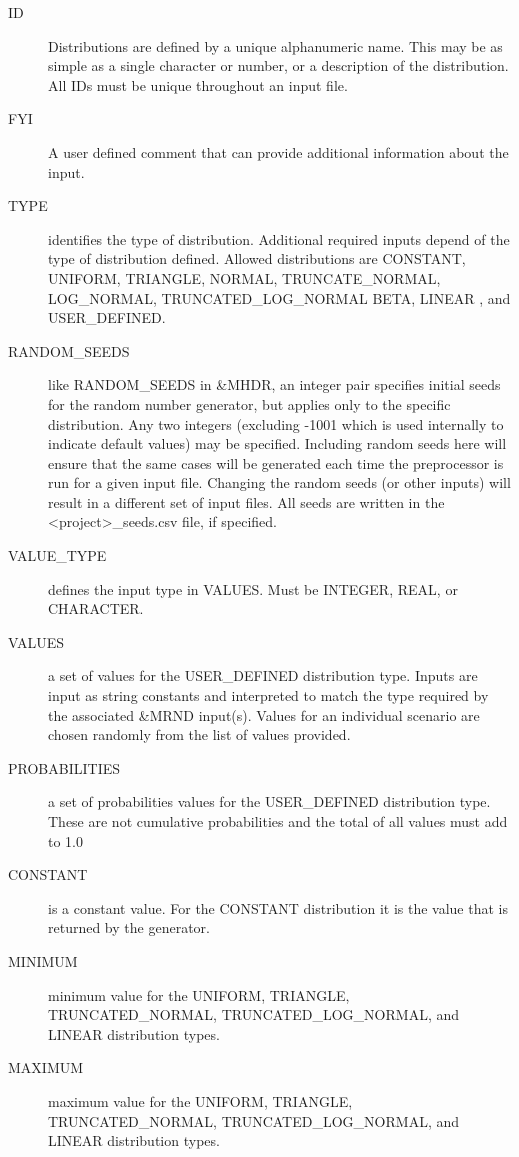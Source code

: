 \documentclass[12pt,twoside]{book}
\begin{document}
\begin{description}
  \item[ID] Distributions are defined by a unique alphanumeric name. This may be as simple as a single character or number, or a description of the distribution. All IDs must be unique throughout an input file.
  \item[FYI] A user defined comment that can provide additional information about the input.
  \item[TYPE] identifies the type of distribution. Additional required inputs depend of the type of distribution defined. Allowed distributions are {\ct CONSTANT},  {\ct UNIFORM}, {\ct TRIANGLE}, {\ct NORMAL}, {\ct TRUNCATE\_NORMAL}, {\ct LOG\_NORMAL}, {\ct TRUNCATED\_LOG\_NORMAL} {\ct BETA}, {\ct LINEAR }, and {\ct USER\_DEFINED}.
  \item[RANDOM\_SEEDS] like {\ct RANDOM\_SEEDS} in {\ct \&MHDR}, an integer pair specifies initial seeds for the random number generator, but applies only to the specific distribution. Any two integers (excluding -1001 which is used internally to indicate default values) may be specified. Including random seeds here will ensure that the same cases will be generated each time the preprocessor is run for a given input file. Changing the random seeds (or other inputs) will result in a different set of input files. All seeds are written in the {\ct <project>\_seeds.csv} file, if specified.
  \item[VALUE\_TYPE] defines the input type in VALUES. Must be {\ct INTEGER}, {\ct REAL}, or {\ct CHARACTER}.
  \item[VALUES] a set of values for the {\ct USER\_DEFINED} distribution type. Inputs are input as string constants and interpreted to match the type required by the associated {\ct \&MRND} input(s). Values for an individual scenario are chosen randomly from the list of values provided.
  \item[PROBABILITIES] a set of probabilities values for the {\ct USER\_DEFINED} distribution type. These are not cumulative probabilities and the total of all values must add to 1.0
  \item[CONSTANT] is a constant value. For the {\ct CONSTANT} distribution it is the value that is returned by the generator.
  \item[MINIMUM] minimum value for the {\ct UNIFORM}, {\ct TRIANGLE}, {\ct TRUNCATED\_NORMAL}, {\ct TRUNCATED\_LOG\_NORMAL}, and {\ct LINEAR} distribution types.
  \item[MAXIMUM] maximum value for the {\ct UNIFORM}, {\ct TRIANGLE}, {\ct TRUNCATED\_NORMAL}, {\ct TRUNCATED\_LOG\_NORMAL}, and {\ct LINEAR} distribution types.

\end{description}
\end{document}
